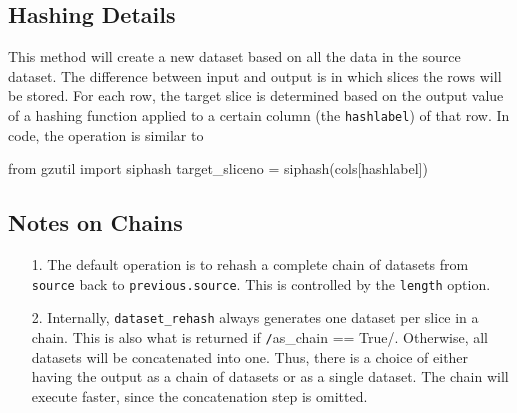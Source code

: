 


\subsection{Hashing Details}
This method will create a new dataset based on all the data in the
source dataset.  The difference between input and output is in which
slices the rows will be stored.  For each row, the target slice is
determined based on the output value of a hashing function applied to
a certain column (the \texttt{hashlabel}) of that row.  In code, the
operation is similar to
\begin{python}
from gzutil import siphash
target_sliceno = siphash(cols[hashlabel]) %
\end{python}

\subsection{Notes on Chains}

\begin{enumerate}
  \item[1.]  The default operation is to rehash a complete chain of
    datasets from \texttt{source} back to \texttt{previous.source}.
    This is controlled by the \texttt{length} option.

  \item[2.]  Internally, \texttt{dataset\_rehash} always generates one
    dataset per slice in a chain.  This is also what is returned if
    \texttt/as\_chain == True/.  Otherwise, all datasets
    will be concatenated into one.  Thus, there is a choice of either
    having the output as a chain of datasets or as a single dataset.
    The chain will execute faster, since the concatenation step is
    omitted.
\end{enumerate}


